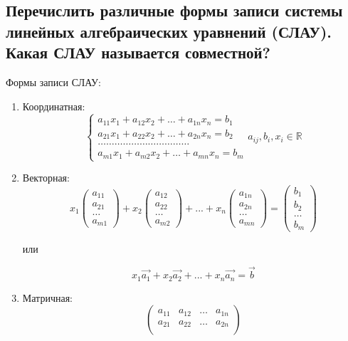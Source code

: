 \subsection{Перечислить различные формы записи системы линейных алгебраических уравнений (СЛАУ). Какая СЛАУ называется совместной?}

\noindent
Формы записи СЛАУ:
\begin{enumerate}
    \item Координатная: 
    $$
    \begin{cases}
        a_{11}x_1+a_{12}x_2+\ldots+a_{1n}x_n = b_1\\
        a_{21}x_1+a_{22}x_2+\ldots+a_{2n}x_n = b_2\\
        \ldots\ldots\ldots\ldots\ldots\ldots\ldots\ldots\ldots\ldots\ldots\\
        a_{m1}x_1+a_{m2}x_2+\ldots+a_{mn}x_n = b_m
    \end{cases}
    a_{ij}, b_i, x_i \in \mathbb{R}
    $$
    \item Векторная:
    $$x_1
    \begin{pmatrix}
        a_{11}\\a_{21}\\\ldots\\a_{m1}
    \end{pmatrix}+x_2
    \begin{pmatrix}
        a_{12}\\a_{22}\\\ldots\\a_{m2}
    \end{pmatrix}+...+x_n
    \begin{pmatrix}
        a_{1n}\\a_{2n}\\\ldots\\a_{mn}
    \end{pmatrix}=
    \begin{pmatrix}
        b_{1}\\b_{2}\\\ldots\\b_{m}
    \end{pmatrix}
    $$
    \begin{center} или \end{center}
    $$
    x_1\vec{a_1}+x_2\vec{a_2}+...+x_n\vec{a_n} = \vec{b}
    $$
    \item Матричная:
    $$
    \begin{pmatrix}
        a_{11}&a_{12}&\ldots&a_{1n}\\
        a_{21}&a_{22}&\ldots&a_{2n}\\

\end{pmatrix}$$
\end{enumerate}
